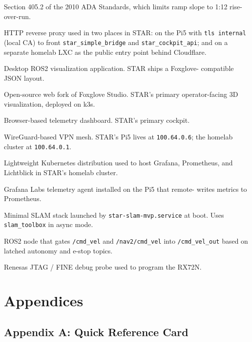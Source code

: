 \documentclass[11pt,letterpaper]{article}
\begin{document}
\begin{description}[leftmargin=4em,style=nextline]
\item[ADA 405.2]
Section 405.2 of the 2010 ADA Standards, which limits ramp slope to
1:12 rise-over-run.
\item[Caddy]
HTTP reverse proxy used in two places in STAR: on the Pi5 with
\texttt{tls internal} (local CA) to front
\texttt{star\_simple\_bridge} and \texttt{star\_cockpit\_api}; and
on a separate homelab LXC as the public entry point behind
Cloudflare.
\item[Foxglove Studio]
Desktop ROS2 visualization application. STAR ships a Foxglove-
compatible JSON layout.
\item[Lichtblick]
Open-source web fork of Foxglove Studio. STAR's primary
operator-facing 3D visualization, deployed on k3s.
\item[Grafana]
Browser-based telemetry dashboard. STAR's primary cockpit.
\item[Tailscale]
WireGuard-based VPN mesh. STAR's Pi5 lives at
\texttt{100.64.0.6}; the homelab cluster at
\texttt{100.64.0.1}.
\item[k3s]
Lightweight Kubernetes distribution used to host Grafana,
Prometheus, and Lichtblick in STAR's homelab cluster.
\item[Alloy]
Grafana Labs telemetry agent installed on the Pi5 that remote-
writes metrics to Prometheus.
\item[SLAM MVP]
Minimal SLAM stack launched by \texttt{star-slam-mvp.service} at
boot. Uses \texttt{slam\_toolbox} in async mode.
\item[Supervisor]
ROS2 node that gates \texttt{/cmd\_vel} and
\texttt{/nav2/cmd\_vel} into \texttt{/cmd\_vel\_out} based on
latched autonomy and e-stop topics.
\item[E2 Lite]
Renesas JTAG / FINE debug probe used to program the RX72N.
\end{description}

\section*{Appendices}

\subsection*{Appendix A: Quick Reference Card}
\end{document}
